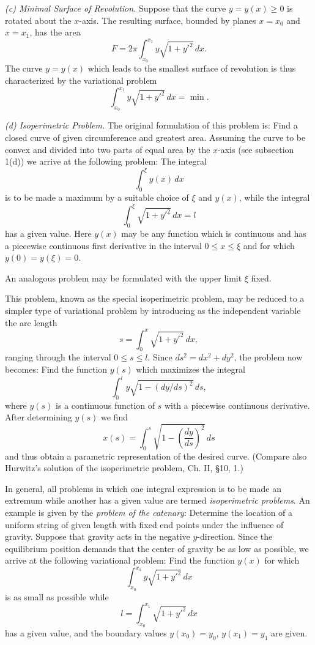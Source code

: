 \emph{(c) Minimal Surface of Revolution.} Suppose that the curve $y=y(x)\ge0$ is rotated about the $x$-axis. The resulting surface, bounded by planes $x=x_0$ and $x=x_1$, has the area
\[
F=2\pi\int_{x_0}^{x_1}y\sqrt{1+y'^2}\,dx.
\]
The curve $y=y(x)$ which leads to the smallest surface of revolution is thus characterized by the variational problem
\[
\int_{x_0}^{x_1}y\sqrt{1+y'^2}\,dx=\min.
\]

\emph{(d) Isoperimetric Problem.} The original formulation of this problem is: Find a closed curve of given circumference and greatest area. Assuming the curve to be convex and divided into two parts of equal area by the $x$-axis (see subsection 1(d)) we arrive at the following problem: The integral
\[
\int_0^{\xi}y(x)\,dx
\]
is to be made a maximum by a suitable choice of $\xi$ and $y(x)$, while the integral
\[
\int_0^{\xi}\sqrt{1+y'^2}\,dx=l
\]
has a given value. Here $y(x)$ may be any function which is continuous and has a piecewise continuous first derivative in the interval $0\le x\le\xi$ and for which $y(0)=y(\xi)=0$.

An analogous problem may be formulated with the upper limit $\xi$ fixed.

This problem, known as the special isoperimetric problem, may be reduced to a simpler type of variational problem by introducing as the independent variable the arc length
\[
s=\int_0^x\sqrt{1+y'^2}\,dx,
\]
ranging through the interval $0\le s\le l$. Since $ds^2=dx^2+dy^2$, the problem now becomes: Find the function $y(s)$ which maximizes the integral
\[
\int_0^l y\sqrt{1-(dy/ds)^2}\,ds,
\]
where $y(s)$ is a continuous function of $s$ with a piecewise continuous derivative. After determining $y(s)$ we find
\begin{equation}\tag{3}
x(s)=\int_0^s\sqrt{1-\left(\frac{dy}{ds}\right)^2}\,ds
\end{equation}
and thus obtain a parametric representation of the desired curve. (Compare also Hurwitz's solution of the isoperimetric problem, Ch. II, \S10, 1.)

In general, all problems in which one integral expression is to be made an extremum while another has a given value are termed \emph{isoperimetric problems}. An example is given by the \emph{problem of the catenary}: Determine the location of a uniform string of given length with fixed end points under the influence of gravity. Suppose that gravity acts in the negative $y$-direction. Since the equilibrium position demands that the center of gravity be as low as possible, we arrive at the following variational problem: Find the function $y(x)$ for which
\[
\int_{x_0}^{x_1}y\sqrt{1+y'^2}\,dx
\]
is as small as possible while
\[
l=\int_{x_0}^{x_1}\sqrt{1+y'^2}\,dx
\]
has a given value, and the boundary values $y(x_0)=y_0$, $y(x_1)=y_1$ are given.

